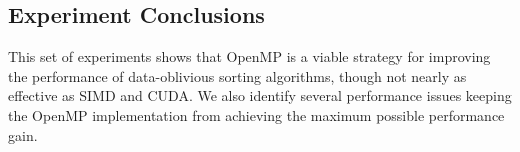 \subsection{Experiment Conclusions}

This set of experiments shows that OpenMP is a viable strategy for improving the performance of data-oblivious sorting algorithms, though not nearly as effective as SIMD and CUDA. We also identify several performance issues keeping the OpenMP implementation from achieving the maximum possible performance gain.